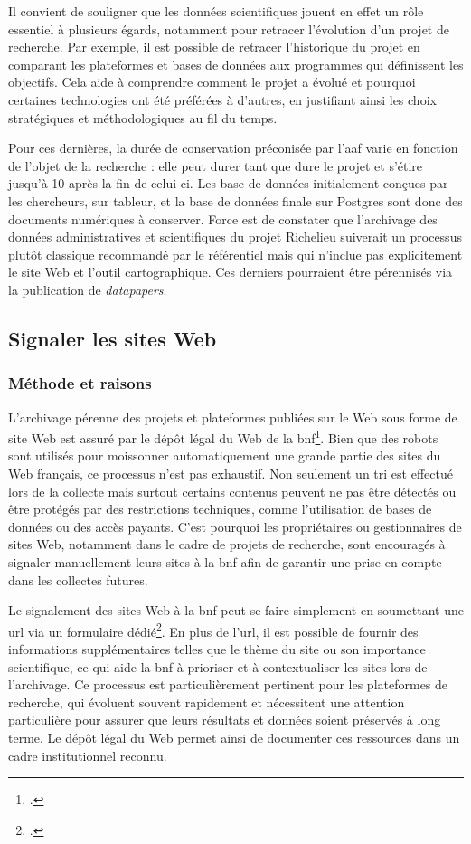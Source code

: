 Il convient de souligner que les données scientifiques jouent en effet un rôle essentiel à plusieurs égards, notamment pour retracer l'évolution d'un projet de recherche. Par exemple, il est possible de retracer l'historique du projet en comparant les plateformes et bases de données aux programmes qui définissent les objectifs. Cela aide à comprendre comment le projet a évolué et pourquoi certaines technologies ont été préférées à d'autres, en justifiant ainsi les choix stratégiques et méthodologiques au fil du temps.

Pour ces dernières, la durée de conservation préconisée par l'\acrshort{aaf} varie en fonction de l'objet de la recherche : elle peut durer tant que dure le projet et s'étire jusqu'à 10 après la fin de celui-ci. Les base de données initialement conçues par les chercheurs, sur tableur, et la base de données finale sur Postgres sont donc des documents numériques à conserver. Force est de constater que l'archivage des données administratives et scientifiques du projet Richelieu suiverait un processus plutôt classique recommandé par le référentiel mais qui n'inclue pas explicitement le site Web et l'outil cartographique. Ces derniers pourraient être pérennisés via la publication de \textit{datapapers}.

\subsection{Signaler les sites Web}

\subsubsection{Méthode et raisons}
L'archivage pérenne des projets et plateformes publiées sur le Web sous forme de site Web est assuré par le dépôt légal du Web de la \acrshort{bnf}\footcite{Depot}. Bien que des robots sont utilisés pour moissonner automatiquement une grande partie des sites du Web français, ce processus n'est pas exhaustif. Non seulement un tri est effectué lors de la collecte mais surtout certains contenus peuvent ne pas être détectés ou être protégés par des restrictions techniques, comme l'utilisation de bases de données ou des accès payants. C'est pourquoi les propriétaires ou gestionnaires de sites Web, notamment dans le cadre de projets de recherche, sont encouragés à signaler manuellement leurs sites à la \acrshort{bnf} afin de garantir une prise en compte dans les collectes futures. 

Le signalement des sites Web à la \acrshort{bnf} peut se faire simplement en soumettant une \acrshort{url} via un formulaire dédié\footcite{Signaler}. En plus de l'\acrshort{url}, il est possible de fournir des informations supplémentaires telles que le thème du site ou son importance scientifique, ce qui aide la \acrshort{bnf} à prioriser et à contextualiser les sites lors de l'archivage. Ce processus est particulièrement pertinent pour les plateformes de recherche, qui évoluent souvent rapidement et nécessitent une attention particulière pour assurer que leurs résultats et données soient préservés à long terme. Le dépôt légal du Web permet ainsi de documenter ces ressources dans un cadre institutionnel reconnu.

